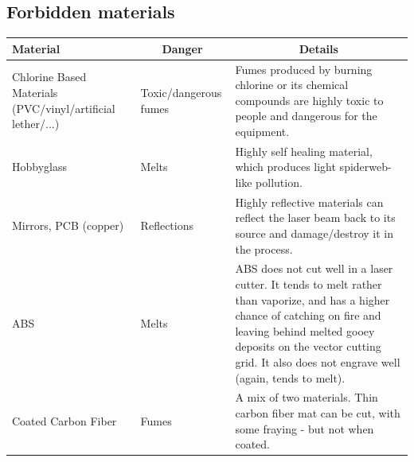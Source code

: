 \documentclass[fleqn]{article}
\begin{document}
\color{industra-manual-darkred}\subsection{Forbidden materials}
\color{black}



\renewcommand{\tabularxcolumn}[1]{m{#1}}
\begin{table}[h]
	
	\centering
	\begin{tabularx}{\textwidth}{|m{10em}|l|X|}
		
		\hline
		\centering
		\textbf{Material} & \multicolumn{1}{c|}{\textbf{Danger}} & \multicolumn{1}{c|}{\textbf{Details}}                                                                                                                                                   \\ \hline
		Chlorine Based Materials (PVC/vinyl/artificial lether/...) & Toxic/dangerous fumes & Fumes produced by burning chlorine or its chemical compounds are highly toxic to people and dangerous for the equipment.                                                             \\ \hline
		Hobbyglass & Melts & Highly self healing material, which produces light spiderweb-like pollution.                                                                                                                                                                    \\ \hline
		Mirrors, PCB (copper) & Reflections & Highly reflective materials can reflect the laser beam back to its source and damage/destroy it in the process.                                                                                                                                                             \\ \hline
		ABS                                                      & Melts & ABS does not cut well in a laser cutter. It tends to melt rather than vaporize, and has a higher chance of catching on fire and leaving behind melted gooey deposits on the vector cutting grid. It also does not engrave well (again, tends to melt).
		\\ \hline
		Coated Carbon Fiber  & Fumes  & A mix of two materials. Thin carbon fiber mat can be cut, with some fraying - but not when coated.                                                                                                                                                                          \\ \hline

\end{tabularx}
\end{table}
\end{document}
